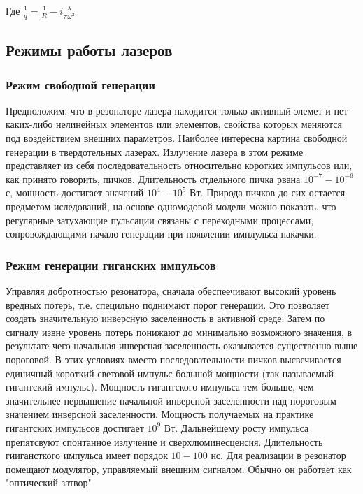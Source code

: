 \documentclass[a4paper]{article}
\begin{document}
Где $\frac{1}{q} = \frac{1}{R} - i \frac{\lambda}{\pi \omega^2}$

\subsection{Режимы работы лазеров}
\subsubsection{Режим свободной генерации}
Предположим, что в резонаторе лазера находится только активный элемет и нет каких-либо нелинейных элементов или элементов, свойства которых меняются под воздействием внешних параметров. Наиболее интересна картина свободной генерации в твердотельных лазерах. Излучение лазера в этом режиме представляет из себя последовательность относительно коротких импульсов или, как принято говорить, пичков. Длительность отдельного пичка рвана $10^{-7}-10^{-6}$ с, мощность достигает значений $10^4 - 10^5$ Вт. Природа пичков до сих остается предметом иследований, на основе одномодовой модели можно показать, что регулярные затухающие пульсации связаны с переходными процессами, сопровождающими начало генерации при появлении имплульса накачки.

\subsubsection{Режим генерации гиганских импульсов} %

Управляя добротностью резонатора, сначала обеспеечивают высокий уровень вредных потерь, т.е. специльно поднимают порог генерации. Это позволяет создать значительную инверсную заселенность в активной среде. Затем по сигналу извне уровень потерь понижают до минимально возможного значения, в результате чего начальная инверсная заселенность оказывается существенно выше пороговой. В этих условиях вместо последовательности пичков высвечивается единичный короткий световой импульс большой мощности (так называемый гигантский импульс). Мощность гигантского импульса тем больше, чем значительнее первышение начальной инверсной заселенности над пороговым значением инверсной заселенности. Мощность получаемых на практике гигантских импульсов достигает $10^9$ Вт. Дальнейшему росту импульса препятсвуют спонтанное излучение и сверхлюминесценсия. Длительность гиигансткого импульса имеет порядок $10-100$ нс. Для реализации в резонатор помещают модулятор, управляемый внешним сигналом. Обычно он работает как "оптический затвор"
\end{document}
